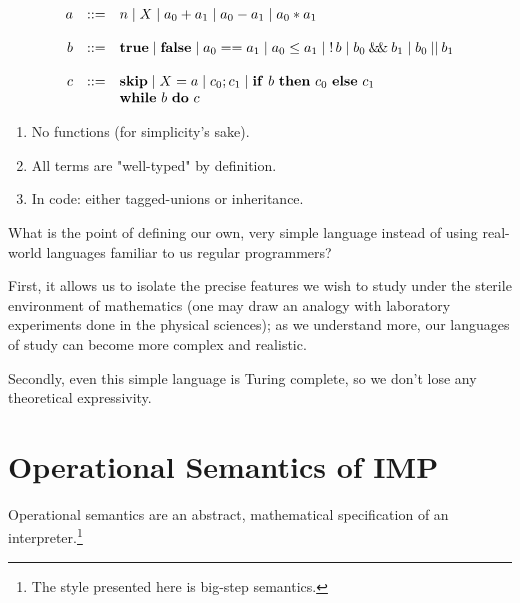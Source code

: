 \begin{frame}
    \[\begin{array}{rcl}
        a & ::= & n
                \mid X
                \mid a_0 + a_1
                \mid a_0 - a_1
                \mid a_0 \ast a_1 \\
                \\
        b & ::= & \mathbf{true}
                \mid \mathbf{false}
                \mid a_0 == a_1
                \mid a_0 \leq a_1
                \mid \progNot b
                \mid b_0 \doubleAmp b_1
                \mid b_0 \doubleBar b_1 \\
                \\
        c & ::= & \mathbf{skip}
                \mid X = a
                \mid c_0; c_1
                \mid \mathbf{if}\ b\ \mathbf{then}\ c_0\ \mathbf{else}\ c_1 \\
                && \mathbf{while}\ b\ \mathbf{do}\ c
    \end{array} \]
    \pause
    \begin{enumerate}
        \item No functions (for simplicity's sake).
        \item All terms are "well-typed" by definition.
        \item In code: either tagged-unions or inheritance.
    \end{enumerate}
\end{frame}

What is the point of defining our own, very simple language instead of using
real-world languages familiar to us regular programmers?

First, it allows us to isolate the precise features we wish to study under
the sterile environment of mathematics (one may draw an analogy with
laboratory experiments done in the physical sciences); as we understand more,
our languages of study can become more complex and realistic.

Secondly, even this simple language is Turing complete, so we don't lose any
theoretical expressivity.

\section{Operational Semantics of IMP}

\begin{frame}
  Operational semantics are an abstract, mathematical specification of an
  interpreter.\footnote{The style presented here is big-step semantics.}
\end{frame}

